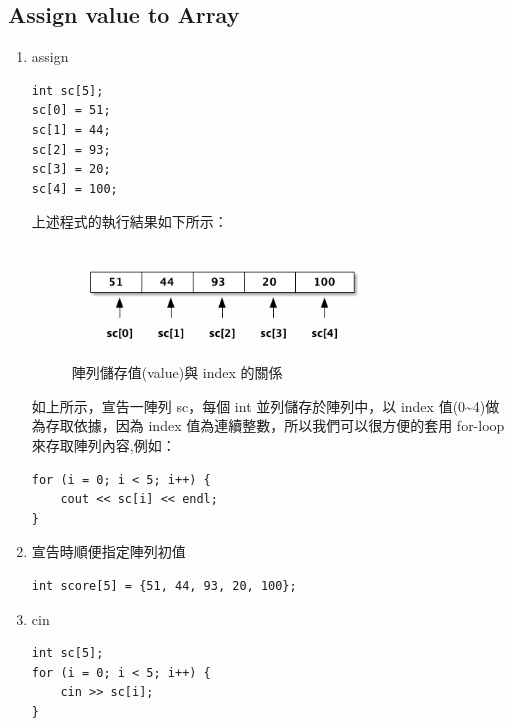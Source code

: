 \documentclass[a4paper,12pt]{article}
\begin{document}
\subsection{Assign value to Array}
\label{sec:org47fa6f3}
\begin{enumerate}
\item assign
\label{sec:org8dcb1d6}
\lstset{breaklines=true,language=cpp,label= ,caption= ,captionpos=b,firstnumber=1,numbers=left}
\begin{lstlisting}
int sc[5];
sc[0] = 51;
sc[1] = 44;
sc[2] = 93;
sc[3] = 20;
sc[4] = 100;
\end{lstlisting}

上述程式的執行結果如下所示：\\
\begin{figure}[htbp]
\centering
\includegraphics[width=300]{images/array.png}
\caption{\label{fig:Array}陣列儲存值(value)與 index 的關係}
\end{figure}

如上所示，宣告一陣列 sc，每個 int 並列儲存於陣列中，以 index 值(0\textasciitilde{}4)做為存取依據，因為 index 值為連續整數，所以我們可以很方便的套用 for-loop 來存取陣列內容,例如：\\
\lstset{breaklines=true,language=cpp,label= ,caption= ,captionpos=b,firstnumber=1,numbers=left}
\begin{lstlisting}
for (i = 0; i < 5; i++) {
    cout << sc[i] << endl;
}
\end{lstlisting}

\item 宣告時順便指定陣列初值
\label{sec:orge1edd9e}
\lstset{breaklines=true,language=cpp,label= ,caption= ,captionpos=b,firstnumber=1,numbers=left}
\begin{lstlisting}
int score[5] = {51, 44, 93, 20, 100};
\end{lstlisting}

\item cin
\label{sec:orgdd0f20f}
\lstset{breaklines=true,language=cpp,label= ,caption= ,captionpos=b,firstnumber=1,numbers=left}
\begin{lstlisting}
int sc[5];
for (i = 0; i < 5; i++) {
    cin >> sc[i];
}
\end{lstlisting}
\end{enumerate}
\end{document}
